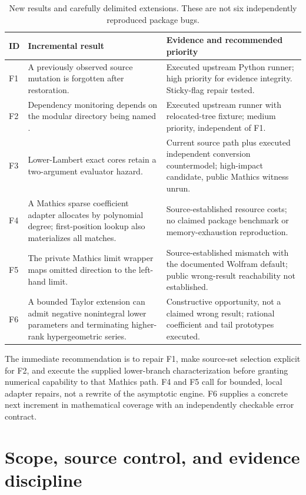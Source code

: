\documentclass[11pt,letterpaper]{article}
\newcommand{\code}[1]{\texttt{\detokenize{#1}}}
\begin{document}
\begin{table}[htbp]
\centering\small
\begin{tabular}{P{.07\linewidth}P{.40\linewidth}P{.42\linewidth}}
\toprule
ID & Incremental result & Evidence and recommended priority \\
\midrule
F1 & A previously observed source mutation is forgotten after restoration. & Executed upstream Python runner; high priority for evidence integrity. Sticky-flag repair tested. \\
F2 & Dependency monitoring depends on the modular directory being named \code{Kernel}. & Executed upstream runner with relocated-tree fixture; medium priority, independent of F1. \\
F3 & Lower-Lambert exact cores retain a two-argument evaluator hazard. & Current source path plus executed independent conversion countermodel; high-impact candidate, public Mathics witness unrun. \\
F4 & A Mathics sparse coefficient adapter allocates by polynomial degree; first-position lookup also materializes all matches. & Source-established resource costs; no claimed package benchmark or memory-exhaustion reproduction. \\
F5 & The private Mathics limit wrapper maps omitted direction to the left-hand limit. & Source-established mismatch with the documented Wolfram default; public wrong-result reachability not established. \\
F6 & A bounded Taylor extension can admit negative nonintegral lower parameters and terminating higher-rank hypergeometric series. & Constructive opportunity, not a claimed wrong result; rational coefficient and tail prototypes executed. \\
\bottomrule
\end{tabular}
\caption{New results and carefully delimited extensions. These are not six independently reproduced package bugs.}
\end{table}

The immediate recommendation is to repair F1, make source-set selection explicit for F2, and execute the supplied lower-branch characterization before granting numerical capability to that Mathics path. F4 and F5 call for bounded, local adapter repairs, not a rewrite of the asymptotic engine. F6 supplies a concrete next increment in mathematical coverage with an independently checkable error contract.

\section{Scope, source control, and evidence discipline}
\end{document}
